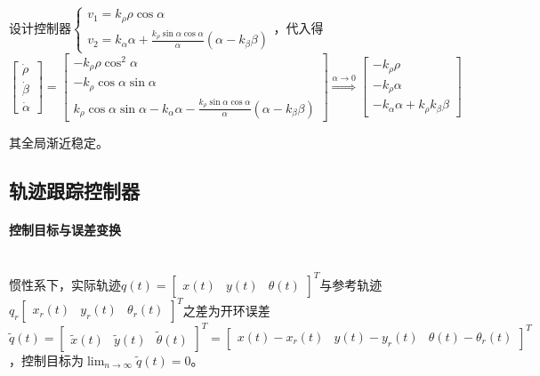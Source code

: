 \documentclass[
12pt, %
a4paper, 
oneside, %
headinclude,footinclude, %
]{scrartcl}
\begin{document}
设计控制器$ \begin{cases} v_1 = k_\rho \rho \cos\alpha \\ v_2 = k_\alpha \alpha + \frac{k_\rho \sin\alpha \cos\alpha}{\alpha}(\alpha - k_\beta \beta) \end{cases} $，代入得
$$ 
\begin{bmatrix} \dot{\rho} \\ \dot{\beta} \\ \dot{\alpha} \end{bmatrix} 
= \begin{bmatrix} -k_\rho \rho \cos^2\alpha \\ -k_\rho \cos\alpha \sin\alpha \\ k_\rho \cos\alpha \sin\alpha - k_\alpha \alpha - \frac{k_\rho \sin\alpha \cos\alpha}{\alpha} (\alpha - k_\beta \beta) \end{bmatrix} 
\overset{\alpha \to 0}{\Longrightarrow}
\begin{bmatrix} -k_\rho \rho \\ -k_\rho \alpha \\ - k_\alpha \alpha + k_\rho k_\beta \beta \end{bmatrix} 
$$

其全局渐近稳定。
\subsection[轨迹跟踪控制器]{轨迹跟踪控制器}
\paragraph{控制目标与误差变换}~\\

惯性系下，实际轨迹$ q(t) = \begin{bmatrix} x(t) & y(t) & \theta(t) \end{bmatrix}^T $与参考轨迹$ q_r \begin{bmatrix} x_r(t) & y_r(t) & \theta_r(t) \end{bmatrix}^T $之差为开环误差$ \tilde{q}(t) = \begin{bmatrix} \tilde{x}(t) & \tilde{y}(t) & \tilde{\theta}(t) \end{bmatrix}^T = \begin{bmatrix} x(t) - x_r(t) & y(t) - y_r(t) & \theta(t) - \theta_r(t) \end{bmatrix}^T $，控制目标为$ \lim_{n \to \infty} \tilde{q}(t) = 0 $。
\end{document}
